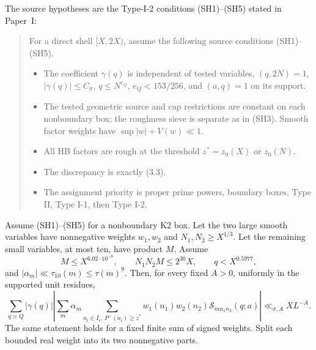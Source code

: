 \begin{lemma}\label{lem:k2-I2-prime}
The source hypotheses are the Type-I-2
conditions (SH1)--(SH5) stated in Paper~I:
\begin{quote}
For a direct shell \([X,2X)\), assume the following source conditions
(SH1)--(SH5).
\begin{itemize}
\item[(SH1)] The coefficient \(\gamma(q)\) is independent of tested variables,
\((q,2N)=1\), \(|\gamma(q)|\le C_\sigma\), \(q\le N^{e_Q}\),
\(e_Q<153/256\), and \((a,q)=1\) on its support.
\item[(SH2)] The tested geometric source and cap restrictions are constant
on each nonboundary box; the roughness sieve is separate as in (SH3).
Smooth factor weights have \(\sup|w|+V(w)\ll1\).
\item[(SH3)] All HB factors are rough at the threshold \(z^*=z_0(X)\) or
\(z_0(N)\).
\item[(SH4)] The discrepancy is exactly (3.3).
\item[(SH5)] The assignment priority is proper prime powers, boundary boxes,
Type II, Type I-1, then Type I-2.
\end{itemize}
\end{quote}
Assume (SH1)--(SH5) for a nonboundary K2 box. Let the two large smooth
variables have nonnegative weights \(w_1,w_2\) and \(N_1,N_2\ge X^{1/3}\).
Let the remaining small variables, at most ten, have product \(M\). Assume
\[
 M\le X^{6.02\cdot10^{-8}},\qquad N_1N_2M\le2^{30}X,
 \qquad q<X^{0.5977},
\]
and \(|\alpha_m|\ll\tau_{10}(m)\le\tau(m)^9\). Then, for every fixed
\(A>0\), uniformly in the supported unit residues,
\[
\sum_{q\asymp Q}|\gamma(q)|\left|\sum_m\alpha_m
 \sum_{n_i\in I_i,\ P^-(n_i)\ge z^*}
 w_1(n_1)w_2(n_2)\mathcal S_{mn_1n_2}(q;a)\right|
\ll_{\sigma,A} XL^{-A}.
\]
The same statement holds for a fixed finite sum of signed weights. Split
each bounded real weight into its two nonnegative parts.
\end{lemma}

